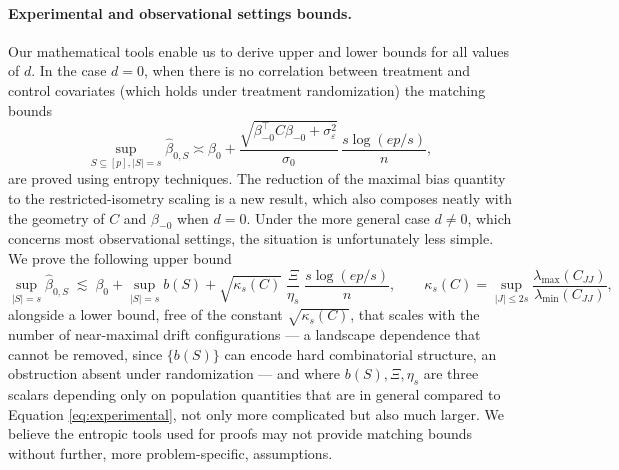 \paragraph{Experimental and observational settings bounds.} Our mathematical tools enable us to derive upper and lower bounds for all values of $d$. In the case $d = 0$, when there is no correlation between treatment and control covariates (which holds under treatment randomization) the matching bounds 
\begin{equation}\label{eq:experimental}
    \sup_{S \subseteq [p], |S| = s} \hat \beta_{0, S} \asymp \beta_0+\frac{\sqrt{\beta_{-0}^\top C\beta_{-0}+\sigma_\varepsilon^2}}{\sigma_0}\, \frac{s \log (ep/s)}{n},
\end{equation}
are proved using entropy techniques. The reduction of the maximal bias quantity to the restricted-isometry scaling is a new result, which also composes neatly with the geometry of $C$ and $\beta_{-0}$ when $d = 0$.  Under the more general case $d \neq 0$, which concerns most observational settings, the situation is unfortunately less simple. We prove the following upper bound
\begin{equation}\label{eq:general-discrete}
        \sup_{|S|=s}\hat\beta_{0,S}
        \;\lesssim\;
        \beta_0+\sup_{|S|=s} b(S)
        + \sqrt{\kappa_s(C)}\;\frac{\Xi}{\eta_s}\;\frac{s\log(ep/s)}{n}, \qquad \kappa_s(C)=\sup_{|J|\le 2s}\frac{\lambda_{\max}(C_{JJ})}{\lambda_{\min}(C_{JJ})},
\end{equation}
alongside a lower bound, free of the constant $\sqrt{\kappa_s(C)}$, that scales with the number of near-maximal drift configurations --- a landscape dependence that cannot be removed, since $\{b(S)\}$ can encode hard combinatorial structure, an obstruction absent under randomization --- and where $b(S), \Xi, \eta_s$ are three scalars depending only on population quantities that are in general compared to Equation \eqref{eq:experimental}, not only more complicated  but also much larger. We believe the entropic tools used for proofs may not provide matching bounds without further, more problem-specific, assumptions.  

